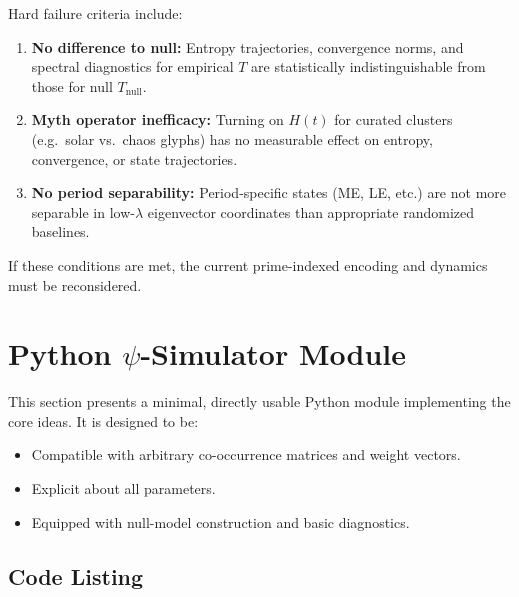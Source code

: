 \documentclass[11pt]{article}
\begin{document}
Hard failure criteria include:

\begin{enumerate}[nosep]
  \item \textbf{No difference to null:} Entropy trajectories,
        convergence norms, and spectral diagnostics for empirical
        \(T\) are statistically indistinguishable from those for
        null \(T_{\text{null}}\).
  \item \textbf{Myth operator inefficacy:} Turning on \(H(t)\) for
        curated clusters (e.g.\ solar vs.\ chaos glyphs) has no
        measurable effect on entropy, convergence, or state
        trajectories.
  \item \textbf{No period separability:} Period-specific states (ME,
        LE, etc.) are not more separable in low-\(\lambda\) eigenvector
        coordinates than appropriate randomized baselines.
\end{enumerate}

If these conditions are met, the current prime-indexed encoding
and dynamics must be reconsidered.

\section{Python \texorpdfstring{$\psi$}{psi}-Simulator Module}

This section presents a minimal, directly usable Python module
implementing the core ideas. It is designed to be:
\begin{itemize}[nosep]
  \item Compatible with arbitrary co-occurrence matrices and weight
        vectors.
  \item Explicit about all parameters.
  \item Equipped with null-model construction and basic diagnostics.
\end{itemize}

\subsection{Code Listing}
\end{document}
